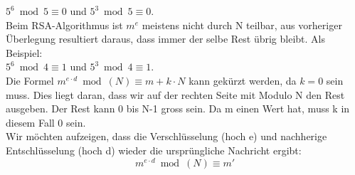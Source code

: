 $ 5^6 \bmod 5 \equiv 0 $ und $ 5^3 \bmod 5 \equiv 0 $. \\
Beim RSA-Algorithmus ist $m^e$ meistens nicht durch N teilbar, aus vorheriger Überlegung resultiert daraus, dass immer der selbe Rest übrig bleibt. Als Beispiel: \\
$5^6 \bmod 4 \equiv 1$ und $5^3 \bmod 4 \equiv 1$. \\
Die Formel $ m^{e \cdot d} \bmod(N) \equiv m + k \cdot N $ kann gekürzt werden, da $ k = 0 $ sein muss. Dies liegt daran, dass wir auf der rechten Seite mit Modulo N den Rest ausgeben. Der Rest kann 0 bis N-1 gross sein. Da m einen Wert hat, muss k in diesem Fall 0 sein. \\
Wir möchten aufzeigen, dass die Verschlüsselung (hoch e) und nachherige Entschlüsselung (hoch d) wieder die ursprüngliche Nachricht ergibt:
\begin{equation*}
 m^{e \cdot d} \bmod(N) \equiv m' 
\end{equation*}
%
\newpage
%
%
%
%
%
